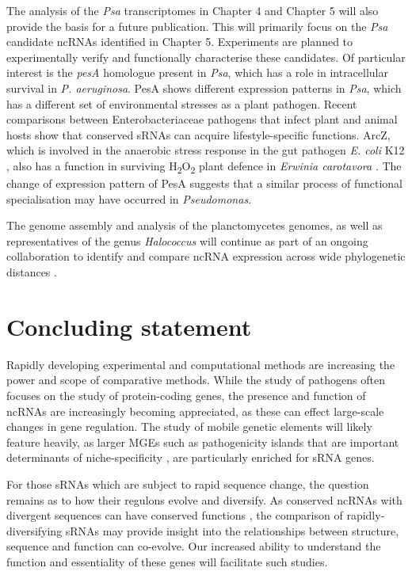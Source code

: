 The analysis of the \textit{Psa} transcriptomes in Chapter 4 and Chapter 5 will also provide the basis for a future publication. This will primarily focus on the \textit{Psa} candidate ncRNAs identified in Chapter 5. Experiments are planned to experimentally verify and functionally characterise these candidates. Of particular interest is the \textit{pesA} homologue present in \textit{Psa}, which has a role in intracellular survival in \textit{P. aeruginosa}. PesA shows different expression patterns in \textit{Psa}, which has a different set of environmental stresses as a plant pathogen. Recent comparisons between Enterobacteriaceae pathogens that infect plant and animal hosts show that conserved sRNAs can acquire lifestyle-specific functions. ArcZ, which is involved in the anaerobic stress response in the gut pathogen \textit{E. coli} K12 \citep{Mandin2010-jf}, also has a function in surviving H\textsubscript{2}O\textsubscript{2} plant defence in \textit{Erwinia carotavora} 
\citep{Schachterle2019-rq}. The change of expression pattern of PesA suggests that a similar process of functional specialisation may have occurred in \textit{Pseudomonas}.

The genome assembly and analysis of the planctomycetes genomes, as well as representatives of the genus \textit{Halococcus} will continue as part of an ongoing collaboration to identify and compare ncRNA expression across wide phylogenetic distances \citep{Lindgreen2014-rmv}.

\section{Concluding statement}

Rapidly developing experimental and computational methods are increasing the power and scope of comparative methods. While the study of pathogens often focuses on the study of protein-coding genes, the presence and function of ncRNAs are increasingly becoming appreciated, as these can effect large-scale changes in gene regulation. The study of mobile genetic elements will likely feature heavily, as larger MGEs such as pathogenicity islands that are important determinants of niche-specificity \citep{Melnyk2019-cclx}, are particularly enriched for sRNA genes.

For those sRNAs which are subject to rapid sequence change, the question remains as to how their regulons evolve and diversify. As conserved ncRNAs with divergent sequences can have conserved functions \citep{Horler2009-vava}, the comparison of rapidly-diversifying sRNAs may provide insight into the relationships between structure, sequence and function can co-evolve. Our increased ability to understand the function and essentiality of these genes will facilitate such studies.

